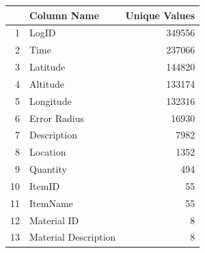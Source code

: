 \documentclass[10pt]{article}\usepackage[]{graphicx}\usepackage[]{color}
\begin{document}
\begin{table}[ht]
\centering
\begin{tabular}{rlr}
  \hline
 & Column Name & Unique Values \\ 
  \hline
1 & LogID & 349556 \\ 
  2 & Time & 237066 \\ 
  3 & Latitude & 144820 \\ 
  4 & Altitude & 133174 \\ 
  5 & Longitude & 132316 \\ 
  6 & Error Radius & 16930 \\ 
  7 & Description & 7982 \\ 
  8 & Location & 1352 \\ 
  9 & Quantity & 494 \\ 
  10 & ItemID &  55 \\ 
  11 & ItemName &  55 \\ 
  12 & Material ID &   8 \\ 
  13 & Material Description &   8 \\ 
   \hline
\end{tabular}
\end{table}
\end{document}
